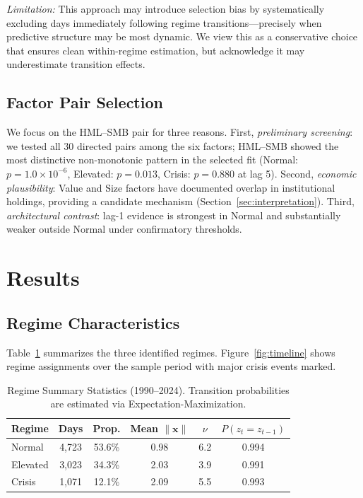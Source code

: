 \documentclass{uai2026}
\begin{document}
\emph{Limitation:} This approach may introduce selection bias by systematically
excluding days immediately following regime transitions---precisely when predictive
structure may be most dynamic. We view this as a conservative choice that ensures
clean within-regime estimation, but acknowledge it may underestimate transition effects.

\subsection{Factor Pair Selection}

We focus on the HML--SMB pair for three reasons. First, \emph{preliminary screening}:
we tested all 30 directed pairs among the six factors; HML--SMB showed the most
distinctive non-monotonic pattern in the selected fit (Normal:
$p = 1.0 \times 10^{-6}$, Elevated: $p = 0.013$, Crisis: $p = 0.880$ at lag 5).
Second, \emph{economic plausibility}:
Value and Size factors have documented overlap in institutional holdings, providing
a candidate mechanism (Section~\ref{sec:interpretation}). Third, \emph{architectural
contrast}: lag-1 evidence is strongest in Normal and substantially weaker outside
Normal under confirmatory thresholds.

\section{Results}

\subsection{Regime Characteristics}

Table~\ref{tab:regimes} summarizes the three identified regimes. Figure~\ref{fig:timeline}
shows regime assignments over the sample period with major crisis events marked.

\begin{table}[t]
\centering
\caption[Regime statistics]{Regime Summary Statistics (1990--2024). Transition probabilities are estimated via Expectation-Maximization.}
\label{tab:regimes}
\small
\begin{tabular}{lccccc}
\toprule
Regime & Days & Prop. & Mean $\|\mathbf{x}\|$ & $\nu$ & $P(z_t=z_{t-1})$ \\
\midrule
Normal & 4,723 & 53.6\% & 0.98 & 6.2 & 0.994 \\
Elevated & 3,023 & 34.3\% & 2.03 & 3.9 & 0.991 \\
Crisis & 1,071 & 12.1\% & 2.09 & 5.5 & 0.993 \\
\bottomrule
\end{tabular}
\end{table}
\end{document}
